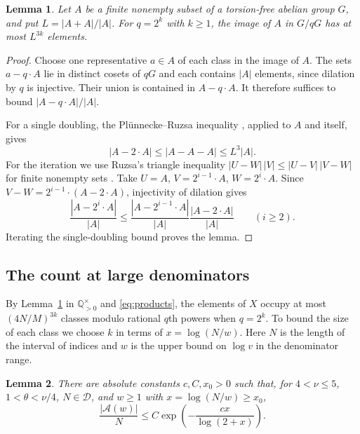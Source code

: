 \documentclass[11pt,reqno]{amsart}
\newtheorem{lemma}{Lemma}[section]
\theoremstyle{definition}
\newcommand{\Q}{\mathbb Q}
\newcommand{\DD}{\mathcal D}
\begin{document}
\begin{lemma}\label{lem:classes}
Let $A$ be a finite nonempty subset of a torsion-free abelian group
$G$, and put $L=|A+A|/|A|$. For $q=2^k$ with $k\ge1$, the image
of $A$ in $G/qG$ has at most $L^{3k}$ elements.
\end{lemma}

\begin{proof}
Choose one representative $a\in A$ of each class in the image of
$A$. The sets $a-q\cdot A$ lie in distinct cosets of $qG$ and
each contains $|A|$ elements, since dilation by $q$ is injective.
Their union is contained in $A-q\cdot A$. It therefore suffices
to bound $|A-q\cdot A|/|A|$.

For a single doubling, the Pl\"unnecke--Ruzsa inequality
\cite[Theorem~1.2]{Petridis}, applied to $A$ and itself, gives
\[
 |A-2\cdot A|\le|A-A-A|\le L^3|A|.
\]
For the iteration we use Ruzsa's triangle inequality
$|U-W|\,|V|\le|U-V|\,|V-W|$ for finite nonempty sets
\cite[proof of Theorem~1.2, (3)]{Petridis}. Take
$U=A$, $V=2^{i-1}\cdot A$, $W=2^i\cdot A$. Since
$V-W=2^{i-1}\cdot(A-2\cdot A)$, injectivity of dilation gives
\[
 \frac{|A-2^i\cdot A|}{|A|}
 \le\frac{|A-2^{i-1}\cdot A|}{|A|}
     \frac{|A-2\cdot A|}{|A|}\qquad(i\ge2).
\]
Iterating the single-doubling bound proves the lemma.
\end{proof}

\subsection{The count at large denominators}

By Lemma~\ref{lem:classes} in $\Q_{>0}^{\times}$ and
\eqref{eq:products}, the elements of $X$ occupy at most
$(4N/M)^{3k}$ classes modulo rational $q$th powers when $q=2^k$.
To bound the size of each class we choose $k$ in terms of
$x=\log(N/w)$. Here $N$ is the length of the interval of indices
and $w$ is the upper bound on $\log v$ in the denominator range.

\begin{lemma}\label{lem:block}
There are absolute constants $c,C,x_0>0$ such that,
for $4<\nu\le5$, $1<\theta<\nu/4$, $N\in\DD$,
and $w\ge1$ with $x=\log(N/w)\ge x_0$,
\[
 \frac{|\mathcal A(w)|}{N}
 \le C\exp\left(-\frac{cx}{\log(2+x)}\right).
\]
\end{lemma}
\end{document}
